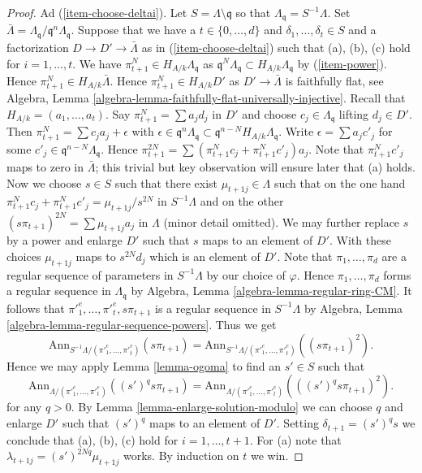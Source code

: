 \begin{proof}
\medskip\noindent
Ad (\ref{item-choose-deltai}). Let $S = \Lambda \setminus \mathfrak q$
so that $\Lambda_\mathfrak q = S^{-1}\Lambda$. Set
$\bar \Lambda = \Lambda_\mathfrak q/\mathfrak q^n \Lambda_\mathfrak q$.
Suppose that we have a $t \in \{0, \ldots, d\}$ and
$\delta_1, \ldots, \delta_t \in S$ and a factorization
$D \to D' \to \bar \Lambda$ as in (\ref{item-choose-deltai})
such that (a), (b), (c) hold for $i = 1, \ldots, t$. We have
$\pi_{t + 1}^N \in H_{A/k}\Lambda_\mathfrak q$
as $\mathfrak q^N \Lambda_\mathfrak q \subset H_{A/k}\Lambda_\mathfrak q$
by (\ref{item-power}). Hence
$\pi_{t + 1}^N \in H_{A/k} \bar\Lambda$. Hence
$\pi_{t + 1}^N \in H_{A/k}D'$ as $D' \to \bar \Lambda$
is faithfully flat, see
Algebra, Lemma \ref{algebra-lemma-faithfully-flat-universally-injective}.
Recall that $H_{A/k} = (a_1, \ldots, a_t)$.
Say $\pi_{t + 1}^N = \sum a_j d_j$ in $D'$ and choose
$c_j \in \Lambda_\mathfrak q$ lifting $d_j \in D'$. Then
$\pi_{t + 1}^N = \sum c_j a_j + \epsilon$ with
$\epsilon \in \mathfrak q^n\Lambda_\mathfrak q \subset
\mathfrak q^{n - N}H_{A/k}\Lambda_\mathfrak q$.
Write $\epsilon = \sum a_j c'_j$ for some
$c'_j \in \mathfrak q^{n - N}\Lambda_\mathfrak q$.
Hence $\pi_{t + 1}^{2N} = \sum (\pi_{t + 1}^N c_j + \pi_{t + 1}^N c'_j) a_j$.
Note that $\pi_{t + 1}^Nc'_j$ maps to zero in $\bar \Lambda$; this trivial
but key observation will ensure later that (a) holds.
Now we choose $s \in S$ such that there exist
$\mu_{t + 1j} \in \Lambda$ such that on the one hand
$\pi_{t + 1}^N c_j + \pi_{t + 1}^N c'_j = \mu_{t + 1j}/s^{2N}$
in $S^{-1}\Lambda$ and on the other
$(s \pi_{t + 1})^{2N} = \sum \mu_{t + 1j}a_j$
in $\Lambda$ (minor detail omitted). We may further replace $s$ by
a power and enlarge $D'$ such that $s$ maps to an element of $D'$.
With these choices $\mu_{t + 1j}$ maps to $s^{2N}d_j$ which is
an element of $D'$. Note that $\pi_1, \ldots, \pi_d$ are a regular
sequence of parameters in $S^{-1}\Lambda$ by our
choice of $\varphi$. Hence $\pi_1, \ldots, \pi_d$ forms a regular sequence
in $\Lambda_\mathfrak q$ by
Algebra, Lemma \ref{algebra-lemma-regular-ring-CM}.
It follows that ${\pi'}_1^e, \ldots, {\pi'}_t^e, s\pi_{t + 1}$ is a
regular sequence in $S^{-1}\Lambda$ by
Algebra, Lemma \ref{algebra-lemma-regular-sequence-powers}.
Thus we get
$$
\text{Ann}_{S^{-1}\Lambda/({\pi'}_1^e, \ldots, {\pi'}_t^e)}(s\pi_{t + 1}) =
\text{Ann}_{S^{-1}\Lambda/({\pi'}_1^e, \ldots, {\pi'}_t^e)}((s\pi_{t + 1})^2).
$$
Hence we may apply Lemma \ref{lemma-ogoma} to find an $s' \in S$
such that
$$
\text{Ann}_{\Lambda/({\pi'}_1^e, \ldots, {\pi'}_t^e)}((s')^qs\pi_{t + 1})
=
\text{Ann}_{\Lambda/({\pi'}_1^e, \ldots, {\pi'}_t^e)}(((s')^qs\pi_{t + 1})^2).
$$
for any $q > 0$. By Lemma \ref{lemma-enlarge-solution-modulo}
we can choose $q$ and enlarge $D'$ such that $(s')^q$ maps to an element
of $D'$. Setting $\delta_{t + 1} = (s')^qs$ we conclude that
(a), (b), (c) hold for $i = 1, \ldots, t + 1$. For (a) note that
$\lambda_{t + 1j} = (s')^{2Nq}\mu_{t + 1j}$ works.
By induction on $t$ we win.


\end{proof}
